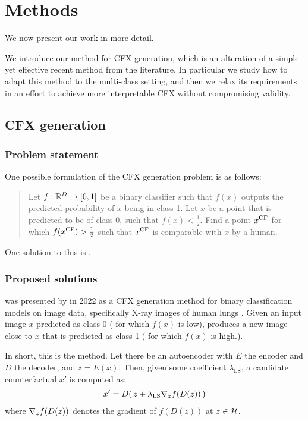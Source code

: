 \documentclass[../main.tex]{subfiles}
\begin{document}
\chapter{Methods}
\label{ch:methods}

We now present our work in more detail.

We introduce our method for CFX generation, which is an alteration of a simple yet effective recent method from the literature.
In particular we study how to adapt this method to the multi-class setting, and then
we relax its requirements in an effort to achieve more interpretable CFX without compromising validity.

\section{CFX generation}

\subsection{Problem statement}

One possible formulation of the CFX generation problem is as follows:
\begin{quote}
Let $f: \R^\inputdim \to [0, 1]$ be a binary classifier such that $f(x)$ outputs the predicted probability of $x$ being in class 1.
Let $x$ be a point that is predicted to be of class 0, \ie{} such that $f(x) < \frac{1}{2}$.
Find a point $\CF{x}$ for which $f(\CF{x}) > \frac{1}{2}$ such that $\CF{x}$ is comparable with $x$ by a human.
\end{quote}

One solution to this is \ls{}.

\subsection{Proposed solutions}
\label{methods:0_sols}

\ls{} was presented by \citeauthor{cohenGifsplanation2022} in 2022 as a CFX generation method for binary classification models on image data, specifically X-ray images of human lungs \cite{cohenGifsplanation2022}.
Given an input image $x$ predicted as class 0 (\ie{} for which $f(x)$ is low), \ls{} produces a new image close to $x$ that is predicted as class 1 (\ie{} for which $f(x)$ is high.).

In short, this is the method.
Let there be an autoencoder with $E$ the encoder and $D$ the decoder, and $z = E(x)$.
Then, given some coefficient $\lambda_\text{LS}$, a candidate counterfactual $x'$ is computed as:
\begin{align*}
    x' = D (\, z + \lambda_\text{LS} \grad{f(D(z))}{z} \,)
\end{align*} 
where $\grad{f(D(z))}{z}$ denotes the gradient of $f(D(z))$ at $z \in \latentspace$.
\end{document}
